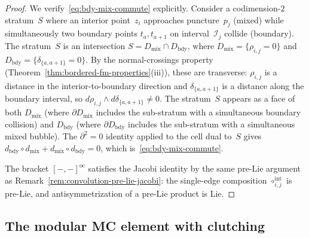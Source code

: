 \begin{proof}
We verify~\eqref{eq:bdy-mix-commute} explicitly.  Consider a
codimension-$2$ stratum~$S$ where an interior point~$z_i$
approaches puncture~$p_j$ (mixed) while simultaneously two
boundary points $t_a, t_{a+1}$ on interval~$\mathcal{I}_j$
collide (boundary).  The stratum~$S$ is an intersection
$S = D_{\mathrm{mix}} \cap D_{\mathrm{bdy}}$, where
$D_{\mathrm{mix}} = \{\rho_{i,j} = 0\}$ and
$D_{\mathrm{bdy}} = \{\delta_{\{a,a+1\}} = 0\}$.
By the normal-crossings property
(Theorem~\ref{thm:bordered-fm-properties}(iii)),
these are transverse:
$\rho_{i,j}$ is a distance in the interior-to-boundary direction
and $\delta_{\{a,a+1\}}$ is a distance along the boundary interval,
so $d\rho_{i,j} \wedge d\delta_{\{a,a+1\}} \neq 0$.
The stratum~$S$ appears as a face of both
$D_{\mathrm{mix}}$ (where $\partial D_{\mathrm{mix}}$ includes the
sub-stratum with a simultaneous boundary collision) and
$D_{\mathrm{bdy}}$ (where $\partial D_{\mathrm{bdy}}$ includes the
sub-stratum with a simultaneous mixed bubble).  The
$\partial^2 = 0$ identity applied to the cell dual to~$S$ gives
$d_{\mathrm{bdy}} \circ d_{\mathrm{mix}}
+ d_{\mathrm{mix}} \circ d_{\mathrm{bdy}} = 0$,
which is~\eqref{eq:bdy-mix-commute}.

The bracket $[-,-]^{\mathrm{oc}}$ satisfies the Jacobi identity
by the same pre-Lie argument as
Remark~\ref{rem:convolution-pre-lie-jacobi}: the
single-edge composition $\circ_{i,j}^{\mathrm{int}}$ is pre-Lie,
and antisymmetrization of a pre-Lie product is Lie.
\end{proof}

\subsection{The modular MC element with clutching}
\label{subsec:modular-mc-element-clutching}

